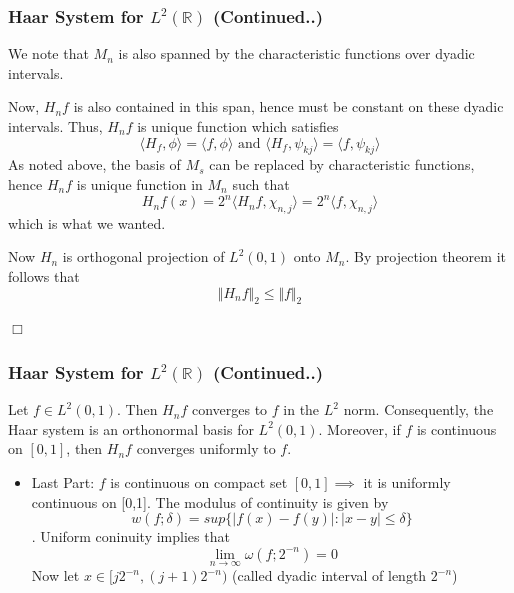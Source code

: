 \documentclass{beamer}
\newcommand{\qedwhite}{\hfill \ensuremath{\Box}}
\begin{document}
\begin{frame}
    \frametitle{Haar System for  $L^2\left({\mathbb{R}}\right)$ (Continued..)}
We note that $M_n$ is also spanned by the characteristic functions over dyadic intervals.

    Now, $H_nf$ is also contained in this span, hence must be constant on these dyadic intervals.
Thus, $H_nf$ is unique function which satisfies $$\langle H_f, \phi  \rangle = \langle f, \phi\rangle \text{ and } \langle H_f, \psi_{kj}  \rangle = \langle f, \psi_{kj}\rangle $$
As noted above, the basis of $M_s$ can be replaced by characteristic functions, hence $H_nf$ is unique function in $M_n$ such that
$$ H_nf(x) = 2^n \langle H_nf, \chi_{n,j}\rangle = 2^n \langle f, \chi_{n,j}\rangle$$ which is what we wanted.

Now $H_n$ is orthogonal projection of $L^2(0,1)$ onto $M_n$. By projection theorem it follows that $$\Vert H_nf\Vert_2 \le \Vert f \Vert_2$$

\qedwhite

\end{frame}

\begin{frame}
    \frametitle{Haar System for  $L^2\left({\mathbb{R}}\right)$ (Continued..)}

\begin{theorem}[15.2.3]
    Let $f \in L^2(0,1)$. Then $H_nf$ converges to $f$ in the $L^2$ norm.
    Consequently, the Haar system is an orthonormal basis for $L^2(0,1)$. 
    Moreover, if $f$ is continuous on $[0, 1]$, then $H_nf$ converges uniformly to $f$.
\end{theorem}


\begin{itemize}
    \item Last Part: $f$ is continuous on compact set $[0,1] \implies$ it is uniformly continuous on [0,1].
    The modulus of continuity is  given  by $$w(f;\delta)  = sup\{|f(x)-f(y)| : |x - y| \le \delta\}$$. 
    Uniform coninuity implies that $$\lim_{n \to \infty} \omega(f;2^{-n})=0$$
    Now let $x \in [j2^{-n}, (j+1)2^{-n})$ (called dyadic interval of length $2^{-n}$)
\end{itemize}

\end{frame}
\end{document}
